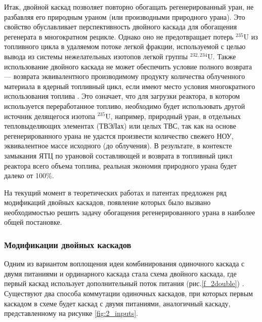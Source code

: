 Итак, двойной каскад позволяет повторно обогащать регенерированный уран, не разбавляя его природным ураном (или производными природного урана). Это свойство обуславливает перспективность двойного каскада для обогащения регенерата в многократном рецикле. Однако оно не предотвращает потерь $^{235}$U из топливного цикла в удаляемом потоке легкой фракции, используемой с целью вывода из системы нежелательных изотопов легкой группы $^{232,234}$U. Также использование двойного каскада не может обеспечить условие полного возврата --- возврата эквивалентного производимому продукту количества облученного материала в ядерный топливный цикл, если имеют место условия многократного использования топлива \cite{smirnovObogashchenieRegenerirovannogoUrana2018}. Это означает, что для загрузки реактора, в котором используется переработанное топливо, необходимо будет использовать другой источник делящегося изотопа $^{235}$U, например, природный уран, в отдельных тепловыделяющих элементах (ТВЭЛах) или целых ТВС, так как на основе регенерированного урана не удастся произвести количество свежего НОУ, эквивалентное массе исходного (до облучения). В результате, в контексте замыкания ЯТЦ по урановой составляющей и возврата в топливный цикл реактора всего объема топлива, реальная экономия природного урана будет далеко от 100\%.


На текущий момент в теоретических работах и патентах предложен ряд модификаций двойных каскадов, появление которых было вызвано необходимостью решить задачу обогащения регенерированного урана в наиболее общей постановке. 

\subsubsection{Модификации двойных каскадов}

Одним из вариантом воплощения идеи комбинирования одиночного каскада с двумя питаниями и ординарного каскада стала схема двойного каскада, где первый каскад использует дополнительный поток питания (рис.\ref{f_2double}) \cite{palkinOchistkaRegenerirovannogoGeksaftorida2013}. Существуют два способа коммутации одиночных каскадов, при которых первым каскадом в схеме будет каскад с двумя питаниями, аналогичный каскаду, представленному на рисунке \ref{fig:2_inputs}.


